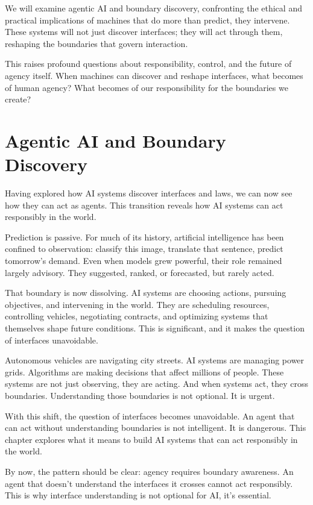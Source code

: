 \documentclass[
  openright]{book}
\begin{document}
We will examine agentic AI and boundary discovery, confronting the
ethical and practical implications of machines that do more than
predict, they intervene. These systems will not just discover
interfaces; they will act through them, reshaping the boundaries that
govern interaction.

This raises profound questions about responsibility, control, and the
future of agency itself. When machines can discover and reshape
interfaces, what becomes of human agency? What becomes of our
responsibility for the boundaries we create?

\chapter{\texorpdfstring{Agentic AI and
Boundary
Discovery}{Agentic AI and Boundary Discovery}}\label{agentic-ai-and-boundary-discovery}

Having explored how AI systems discover interfaces and laws, we can now
see how they can act as agents. This transition reveals how AI systems
can act responsibly in the world.

Prediction is passive. For much of its history, artificial intelligence
has been confined to observation: classify this image, translate that
sentence, predict tomorrow's demand. Even when models grew powerful,
their role remained largely advisory. They suggested, ranked, or
forecasted, but rarely acted.

That boundary is now dissolving. AI systems are choosing actions,
pursuing objectives, and intervening in the world. They are scheduling
resources, controlling vehicles, negotiating contracts, and optimizing
systems that themselves shape future conditions. This is significant,
and it makes the question of interfaces unavoidable.

Autonomous vehicles are navigating city streets. AI systems are managing
power grids. Algorithms are making decisions that affect millions of
people. These systems are not just observing, they are acting. And when
systems act, they cross boundaries. Understanding those boundaries is
not optional. It is urgent.

With this shift, the question of interfaces becomes unavoidable. An
agent that can act without understanding boundaries is not intelligent.
It is dangerous. This chapter explores what it means to build AI systems
that can act responsibly in the world.

By now, the pattern should be clear: agency requires boundary awareness.
An agent that doesn't understand the interfaces it crosses cannot act
responsibly. This is why interface understanding is not optional for AI,
it's essential.
\end{document}
